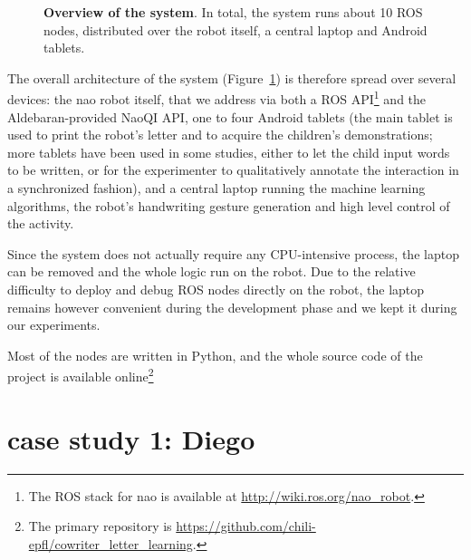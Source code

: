\documentclass{sig-alternate}
\begin{document}
\begin{figure}[ht!]
{
}

\caption{\small \textbf{Overview of the system}. In total, the system runs about 10 ROS nodes,
    distributed over the robot itself, a central laptop and Android tablets.}

    \label{fig:archi}
\end{figure}

The overall architecture of the system (Figure~\ref{fig:archi}) is therefore
spread over several devices: the {\sc nao} robot itself, that we address via
both a ROS API\footnote{The ROS stack for {\sc nao} is available at
\url{http://wiki.ros.org/nao_robot}.} and the Aldebaran-provided NaoQI API, one
to four Android tablets (the main tablet is used to print the robot's letter and
to acquire the children's demonstrations; more tablets have been used in some
studies, either to let the child input words to be written, or for the
experimenter to qualitatively annotate the interaction in a synchronized
fashion), and a central laptop running the machine learning algorithms, the
robot's handwriting gesture generation and high level control of the activity.

Since the system does not actually require any CPU-intensive process, the laptop
can be removed and the whole logic run on the robot. Due to the relative
difficulty to deploy and debug ROS nodes directly on the robot, the laptop
remains however convenient during the development phase and we kept it during
our experiments.

Most of the nodes are written in Python, and the whole source code of the
project is available online\footnote{The primary repository is
\url{https://github.com/chili-epfl/cowriter_letter_learning}.}


\section{case study 1: Diego}\label{diego}
\end{document}
